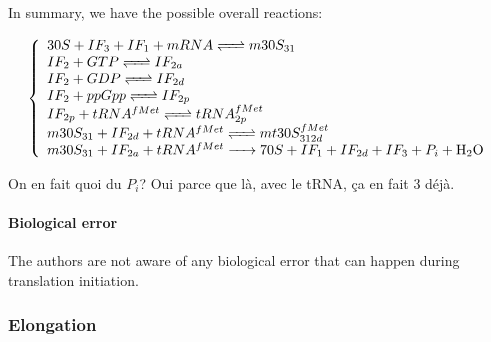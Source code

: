 \medskip

In summary, we have the possible overall reactions:
\begin{mdframed}[style=MyFrame]
$$
  \left\{
    \begin{array}{l}
      \reactionRev{30S+IF_3+IF_1+mRNA}{m30S_{31}}{}{} \\
      \reactionRev{IF_2+GTP}{IF_{2a}}{}{} \\
      \reactionRev{IF_2+GDP}{IF_{2d}}{}{} \\
      \reactionRev{IF_2+ppGpp}{IF_{2p}}{}{} \\
      \reactionRev{IF_{2p}+tRNA^{fMet}}{tRNA_{2p}^{fMet}}{}{}{} \\
      \reactionRev{m30S_{31}+IF_{2d}+tRNA^{fMet}}{mt30S_{312d}^{fMet}}{}{}{} \\
      \reactionIrr{m30S_{31}+IF_{2a}+tRNA^{fMet}}{70S+IF_1+IF_{2d}+IF_3+P_i+\ce{H2O}}{}{}{} \\
    \end{array}
  \right.
$$
\end{mdframed}
\textcolor[rgb]{1.00,0.00,0.00}{On en fait quoi du $P_i$? Oui parce que là, avec le tRNA, ça en fait 3 déjà.}


\paragraph{Biological error} The authors are not aware of any biological error that can happen during translation initiation.



\subsubsection{Elongation}
